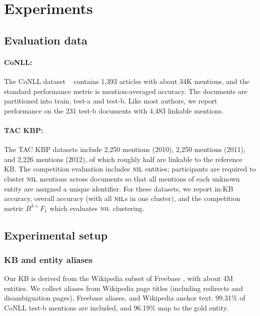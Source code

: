 \section{Experiments}
\label{sec:expt}

\subsection{Evaluation data}

\paragraph*{CoNLL:} 
The CoNLL dataset ~\cite{Hoffart2011} contains 1,393 articles with
about 34K mentions, and the standard performance metric is
mention-averaged accuracy.  The documents are partitioned into train,
test-a and test-b.  Like most authors, we report performance on the
231 test-b documents with 4,483 linkable mentions.

\paragraph*{TAC KBP:} 
The TAC KBP datasets \cite{TAC2010,TAC2011,TAC2012} include 2,250 mentions (2010),
2,250 mentions (2011), and 2,226 mentions (2012), 
of which roughly half are linkable
to the reference KB.  The competition evaluation includes $\mbox{\textsc{nil}}$
entities; participants are required to cluster $\mbox{\textsc{nil}}$ mentions across
documents so that all mentions of each unknown entity are assigned a
unique identifier.  For these datasets, we report in-KB accuracy,
overall accuracy (with all $\mbox{\textsc{nil}}$s in one cluster), and the competition
metric $B^{3+} F_1$ which evaluates $\mbox{\textsc{nil}}$ clustering.

\subsection{Experimental setup}

\subsubsection{KB and entity aliases}

Our KB is derived from the Wikipedia subset of Freebase
\cite{BollackerEPST08}, with about 4M entities.  We collect aliases
from Wikipedia page titles (including redirects and disambiguation
pages), Freebase aliases, and Wikipedia anchor text.
99.31\% of CoNLL test-b mentions are included, and 96.19\% map to the gold entity.

